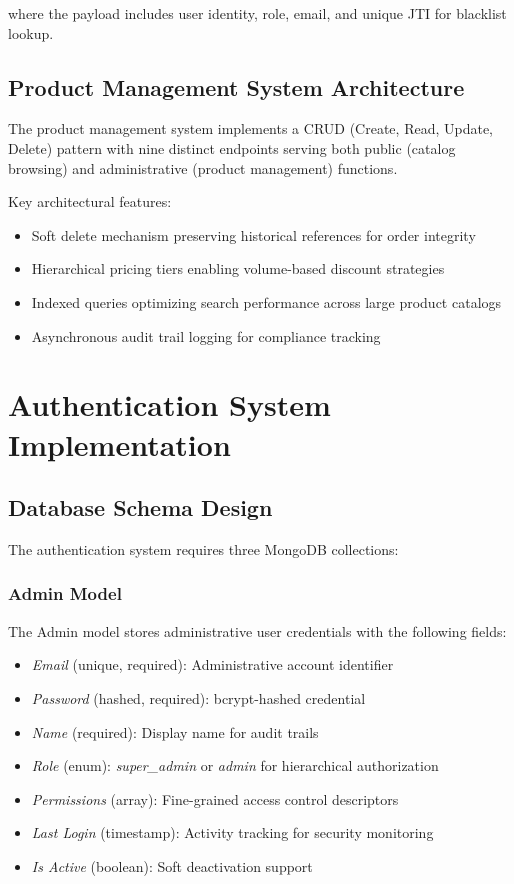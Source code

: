 \documentclass[conference]{IEEEtran}
\begin{document}
where the payload includes user identity, role, email, and unique JTI for blacklist lookup.

\subsection{Product Management System Architecture}

The product management system implements a CRUD (Create, Read, Update, Delete) pattern with nine distinct endpoints serving both public (catalog browsing) and administrative (product management) functions.

Key architectural features:
\begin{itemize}
\item Soft delete mechanism preserving historical references for order integrity
\item Hierarchical pricing tiers enabling volume-based discount strategies
\item Indexed queries optimizing search performance across large product catalogs
\item Asynchronous audit trail logging for compliance tracking
\end{itemize}

\section{Authentication System Implementation}

\subsection{Database Schema Design}

The authentication system requires three MongoDB collections:

\subsubsection{Admin Model}
The Admin model stores administrative user credentials with the following fields:
\begin{itemize}
\item \textit{Email} (unique, required): Administrative account identifier
\item \textit{Password} (hashed, required): bcrypt-hashed credential
\item \textit{Name} (required): Display name for audit trails
\item \textit{Role} (enum): \textit{super\_admin} or \textit{admin} for hierarchical authorization
\item \textit{Permissions} (array): Fine-grained access control descriptors
\item \textit{Last Login} (timestamp): Activity tracking for security monitoring
\item \textit{Is Active} (boolean): Soft deactivation support
\end{itemize}
\end{document}
